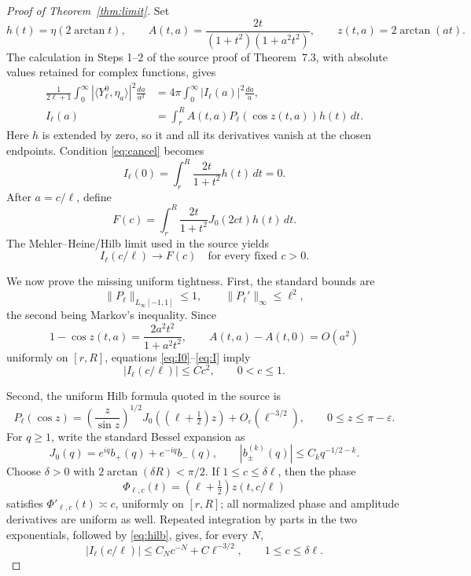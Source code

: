 \documentclass[11pt]{article}
\begin{document}
\begin{proof}[Proof of Theorem~\ref{thm:limit}]
Set
\[
 h(t)=\eta(2\arctan t),\qquad
 A(t,a)=\frac{2t}{(1+t^2)(1+a^2t^2)},\qquad
 z(t,a)=2\arctan(at).
\]
The calculation in Steps 1--2 of the source proof of Theorem~7.3, with
absolute values retained for complex functions, gives
\begin{align}
 \frac1{2\ell+1}\int_0^\infty
 |\langle Y_\ell^0,\eta_a\rangle|^2\frac{da}{a^3}
 &=4\pi\int_0^\infty |I_\ell(a)|^2\frac{da}{a},\label{eq:normal}\\
 I_\ell(a)&=\int_r^R A(t,a)P_\ell(\cos z(t,a))h(t)\,dt.\label{eq:I}
\end{align}
Here \(h\) is extended by zero, so it and all its derivatives vanish at the
chosen endpoints.  Condition \eqref{eq:cancel} becomes
\begin{equation}\label{eq:I0}
 I_\ell(0)=\int_r^R \frac{2t}{1+t^2}h(t)\,dt=0.
\end{equation}
After \(a=c/\ell\), define
\[
 F(c)=\int_r^R\frac{2t}{1+t^2}J_0(2ct)h(t)\,dt.
\]
The Mehler--Heine/Hilb limit used in the source yields
\begin{equation}\label{eq:pointwise}
 I_\ell(c/\ell)\longrightarrow F(c)
 \quad\text{for every fixed }c>0.
\end{equation}

We now prove the missing uniform tightness.  First, the standard bounds are
\[
 \|P_\ell\|_{L_\infty[-1,1]}\le1,\qquad
 \|P_\ell'\|_\infty\le\ell^2,
\]
the second being Markov's inequality.  Since
\[
 1-\cos z(t,a)=\frac{2a^2t^2}{1+a^2t^2},
 \qquad A(t,a)-A(t,0)=O(a^2)
\]
uniformly on \([r,R]\), equations \eqref{eq:I0}--\eqref{eq:I} imply
\begin{equation}\label{eq:small}
 |I_\ell(c/\ell)|\le Cc^2,\qquad 0<c\le1.
\end{equation}

Second, the uniform Hilb formula quoted in the source is
\begin{equation}\label{eq:hilb}
 P_\ell(\cos z)=\left(\frac z{\sin z}\right)^{1/2}
 J_0((\ell+\tfrac12)z)+O_\varepsilon(\ell^{-3/2}),
 \qquad 0\le z\le\pi-\varepsilon.
\end{equation}
For \(q\ge1\), write the standard Bessel expansion as
\[
 J_0(q)=e^{iq}b_+(q)+e^{-iq}b_-(q),\qquad
 |b_\pm^{(k)}(q)|\le C_kq^{-1/2-k}.
\]
Choose \(\delta>0\) with \(2\arctan(\delta R)<\pi/2\).  If
\(1\le c\le\delta\ell\), then the phase
\[
 \Phi_{\ell,c}(t)=(\ell+\tfrac12)z(t,c/\ell)
\]
satisfies \(\Phi'_{\ell,c}(t)\asymp c\), uniformly on \([r,R]\); all normalized
phase and amplitude derivatives are uniform as well.  Repeated integration by
parts in the two exponentials, followed by \eqref{eq:hilb}, gives, for every
\(N\),
\begin{equation}\label{eq:lowtail}
 |I_\ell(c/\ell)|\le C_Nc^{-N}+C\ell^{-3/2},\qquad
 1\le c\le\delta\ell.
\end{equation}


\end{proof}
\end{document}
